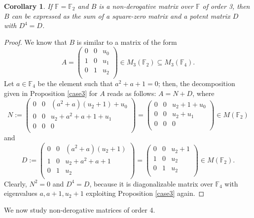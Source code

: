 \documentclass{amsart}
\def\FF{\mathbb{F}}
\newtheorem{corollary}[theorem]{Corollary}
\theoremstyle{definition}
\theoremstyle{remark}
\numberwithin{equation}{section}
\begin{document}
\begin{corollary}\label{case3-corollary}
If $\FF=\FF_2$ and $B$ is a non-derogative matrix over $\FF$ of order 3, then $B$ can be expressed as the sum of a square-zero matrix and a potent matrix $D$ with $D^4=D$.
\end{corollary}

\begin{proof}
We know that $B$ is similar to a matrix of the form
$$A=\left(
  \begin{array}{ccc}
     0 & 0 & u_0 \\
     1 & 0 & u_1 \\
     0 & 1 & u_2 \\
  \end{array}
\right)\in M_3(\FF_2)\subseteq M_3(\FF_4).$$
Let $a\in \FF_4$ be the element such that $a^2+a+1=0$; then, the decomposition given in Proposition \ref{case3} for $A$ reads as follows: $A=N+D$, where
$$
N:=\left(
  \begin{array}{ccc}
     0 & 0 & (a^2+a)(u_2+1)+u_0 \\
     0 & 0 & u_2+a^2+a+1+u_1 \\
     0 & 0 & 0 \\
  \end{array}
\right)=\left(
  \begin{array}{ccc}
     0 & 0 & u_2+1+u_0 \\
     0 & 0 & u_2+u_1 \\
     0 & 0 & 0 \\
  \end{array}
\right)\in M(\FF_2)
$$
\noindent and
$$
D:=\left(
  \begin{array}{ccc}
     0 & 0 & (a^2+a)(u_2+1) \\
     1 & 0 & u_2+a^2+a+1 \\
     0 & 1 & u_2 \\
  \end{array}
\right)=\left(
  \begin{array}{ccc}
     0 & 0 & u_2+1 \\
     1 & 0 & u_2 \\
     0 & 1 & u_2 \\
  \end{array}
\right)\in M(\FF_2).
$$
Clearly, $N^2=0$ and $D^4=D$, because it is diagonalizable matrix over $\FF_4$ with eigenvalues $a,a+1,u_2+1$ exploiting Proposition \ref{case3} again.
\end{proof}

We now study non-derogative matrices of order 4.
\end{document}
